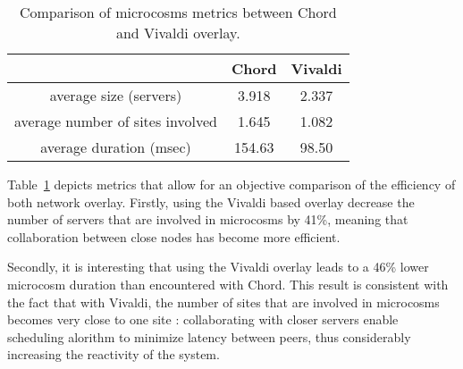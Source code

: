 \begin{table}

  \begin{center}
    \begin{tabular}{|c|c|c|}   

      \hline \multicolumn{1}{|p{3cm}|}{ }
       & \multicolumn{1}{|p{3cm}|}{\centering Chord }  & \multicolumn{1}{|p{3cm}|}{ \centering Vivaldi}  \\

      \hline
      average size (servers) & 3.918 & 2.337 \\

      \hline
      average number of sites involved & 1.645 & 1.082 \\

      \hline
      average duration (msec) & 154.63 & 98.50 \\

      \hline
    \end{tabular}
  \end{center}
  \caption{\label{microcosm_table} Comparison of microcosms metrics between Chord and Vivaldi overlay.}
\end{table}


Table~\ref{microcosm_table} depicts metrics that allow for an objective 
comparison of the efficiency of both network overlay. Firstly, using the Vivaldi
based overlay decrease the number of servers that are involved in microcosms by
41\%, meaning that collaboration between close nodes has become more efficient.

Secondly, it is interesting that using the Vivaldi overlay leads to a 46\% lower
microcosm duration than encountered with Chord. This result is consistent with 
the fact that with Vivaldi, the number of sites that are involved in microcosms
becomes very close to one site : collaborating with closer servers enable
scheduling alorithm to minimize latency between peers, thus considerably 
increasing the reactivity of the system.
% 